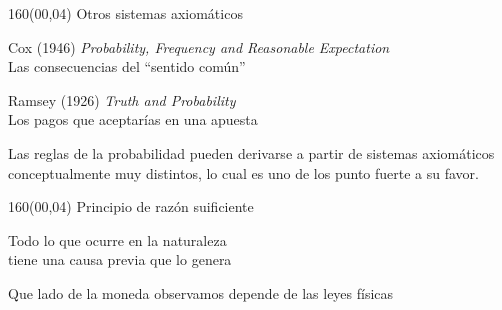 \documentclass[shownotes,aspectratio=169]{beamer}
\begin{document}
\begin{frame}[plain] \centering
\begin{textblock}{160}(00,04)
\centering \LARGE Otros sistemas axiomáticos \\
\end{textblock}
\vspace{1.2cm} \centering

Cox (1946) \emph{Probability, Frequency and Reasonable Expectation}\\[0.1cm]
Las consecuencias del ``sentido común''

\vspace{0.8cm}

Ramsey (1926) \emph{Truth and Probability} \\[0.1cm]
Los pagos que aceptarías en una apuesta

\vspace{0.4cm}

\begin{framed}
Las reglas de la probabilidad pueden derivarse a partir de sistemas axiomáticos conceptualmente muy distintos, lo cual es uno de los punto fuerte a su favor.
\end{framed}

\end{frame}

\begin{frame}[plain]
\begin{textblock}{160}(00,04)
\centering
\LARGE Principio de razón suificiente
\end{textblock}
\vspace{1.5cm} \Large

\centering
Todo lo que ocurre en la naturaleza \\ tiene una causa previa que lo genera

\large 

\vspace{1.5cm}

Que lado de la moneda observamos depende de las leyes físicas
\end{frame}
\end{document}
